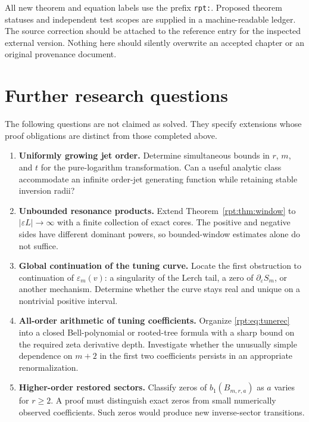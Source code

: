 \documentclass[11pt,a4paper]{article}
\numberwithin{equation}{section}
\theoremstyle{definition}\newtheorem{definition}[theorem]{Definition}
\theoremstyle{remark}\newtheorem{remark}[theorem]{Remark}
\newcommand{\eps}{\varepsilon}
\begin{document}
All new theorem and equation labels use the prefix \texttt{rpt:}. Proposed theorem statuses and independent test scopes are supplied in a machine-readable ledger. The source correction should be attached to the reference entry for the inspected external version. Nothing here should silently overwrite an accepted chapter or an original provenance document.

\section{Further research questions}
\label{rpt:sec:questions}

The following questions are not claimed as solved. They specify extensions whose proof obligations are distinct from those completed above.

\begin{enumerate}[label=\textbf{Q\arabic*.},leftmargin=2.8em,itemsep=8pt]
\item \textbf{Uniformly growing jet order.} Determine simultaneous bounds in $r$, $m$, and $t$ for the pure-logarithm transformation. Can a useful analytic class accommodate an infinite order-jet generating function while retaining stable inversion radii?

\item \textbf{Unbounded resonance products.} Extend Theorem~\ref{rpt:thm:window} to $|\eps L|\to\infty$ with a finite collection of exact cores. The positive and negative sides have different dominant powers, so bounded-window estimates alone do not suffice.

\item \textbf{Global continuation of the tuning curve.} Locate the first obstruction to continuation of $\eps_m(v)$: a singularity of the Lerch tail, a zero of $\partial_\eps S_m$, or another mechanism. Determine whether the curve stays real and unique on a nontrivial positive interval.

\item \textbf{All-order arithmetic of tuning coefficients.} Organize \eqref{rpt:eq:tunerec} into a closed Bell-polynomial or rooted-tree formula with a sharp bound on the required zeta derivative depth. Investigate whether the unusually simple dependence on $m+2$ in the first two coefficients persists in an appropriate renormalization.

\item \textbf{Higher-order restored sectors.} Classify zeros of $b_1(B_{m,r,a})$ as $a$ varies for $r\ge2$. A proof must distinguish exact zeros from small numerically observed coefficients. Such zeros would produce new inverse-sector transitions.


\end{enumerate}
\end{document}
